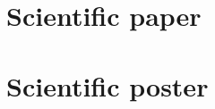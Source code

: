 \documentclass[master=cws,english]{kulemt}
\begin{document}
\listoffiguresandtables

\printglossaries

\mainmatter







\appendix

\chapter{Scientific paper}\label{paper}\cleardoublepage

\chapter{Scientific poster}\label{poster}\cleardoublepage


\backmatter

\end{document}
